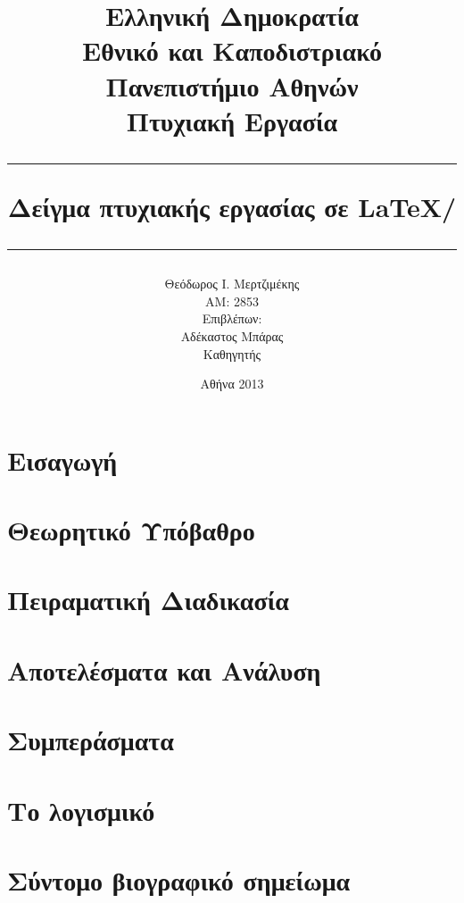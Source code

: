 \documentclass[12pt]{report}
\title{
\vspace{-50mm}
{\large Ελληνική Δημοκρατία}\\
{\large Εθνικό και Καποδιστριακό}\\
{\large Πανεπιστήμιο Αθηνών}\\[30mm]
{\normalsize Πτυχιακή Εργασία}\\[10mm]
\hrule
\vspace{5mm}
Δείγμα πτυχιακής εργασίας σε \LaTeX/\XeTeX
\vspace{5mm}
\hrule}
\author{
{\Large Θεόδωρος Ι. Μερτζιμέκης}\\
AM: 2853\\[10mm]
Επιβλέπων:\\
Αδέκαστος Μπάρας\\
Καθηγητής\\[20mm]
}
\date{Αθήνα 2013}
\begin{document}
\maketitle

\newpage
\thispagestyle{empty}
\phantom{~}
\vfill

%

\tableofcontents


\chapter{Εισαγωγή}



\chapter{Θεωρητικό Υπόβαθρο}
%
\chapter{Πειραματική Διαδικασία}
%
\chapter{Αποτελέσματα και Ανάλυση}
%
\chapter{Συμπεράσματα}
%





\appendix
\chapter{Το λογισμικό}
%
\chapter{Σύντομο βιογραφικό σημείωμα}
%
\end{document}
